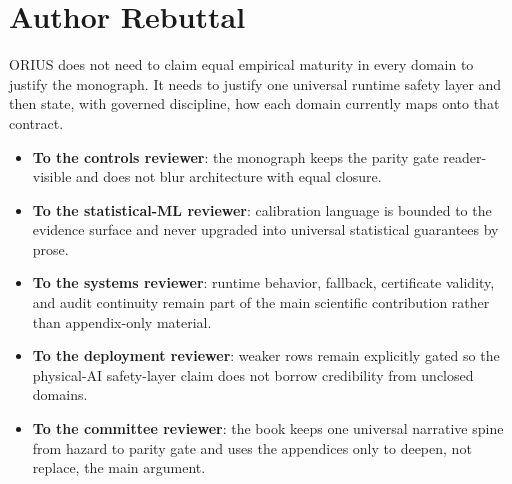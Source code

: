 \section{Author Rebuttal}
ORIUS does not need to claim equal empirical maturity in every domain to justify the monograph. It needs to justify one universal runtime safety layer and then state, with governed discipline, how each domain currently maps onto that contract.
\begin{itemize}
\item \textbf{To the controls reviewer}: the monograph keeps the parity gate reader-visible and does not blur architecture with equal closure.
\item \textbf{To the statistical-ML reviewer}: calibration language is bounded to the evidence surface and never upgraded into universal statistical guarantees by prose.
\item \textbf{To the systems reviewer}: runtime behavior, fallback, certificate validity, and audit continuity remain part of the main scientific contribution rather than appendix-only material.
\item \textbf{To the deployment reviewer}: weaker rows remain explicitly gated so the physical-AI safety-layer claim does not borrow credibility from unclosed domains.
\item \textbf{To the committee reviewer}: the book keeps one universal narrative spine from hazard to parity gate and uses the appendices only to deepen, not replace, the main argument.
\end{itemize}

